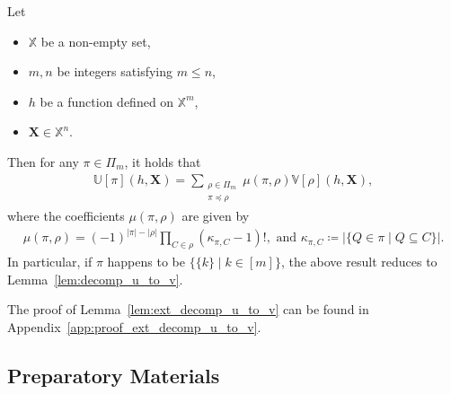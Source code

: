 \documentclass[twoside,11pt]{article}
\newcommand{\sPi}{\pi}
\newcommand{\ustat}{\mathbb{U}}
\newcommand{\vstat}{\mathbb{V}}
\newcommand{\samplespace}{\bbX}
\newcommand{\partition}{\Pi}
\newcommand{\partitionp}[1]{\partition_{#1}}
\newcommand{\pleq}{\preceq}
\def\bbX{\mathbb{X}}
\begin{document}
\begin{lemma}
\label{lem:ext_decomp_u_to_v}
    Let
    \begin{itemize}
        \item $\samplespace$ be a non-empty set,
        \item $m,n$ be integers satisfying $m \leq n$,
        \item $h$ be a function defined on $\samplespace^m$,
        \item $\bm{X} \in \samplespace^n$. 
    \end{itemize}
    Then for any $\sPi \in \partitionp{m}$, it holds that
    \begin{align*}
        \ustat[\sPi](h,\bm{X}) 
        = \sum_{\substack{ \rho \in \partitionp{m} \\ \sPi \pleq \rho }}  
        \mu(\sPi, \rho)  \vstat[\rho](h, \bm{X}),
    \end{align*}
    where the coefficients $\mu(\sPi, \rho)$ are given by
    \begin{align*}
        \mu(\sPi, \rho) 
        = (-1)^{|\sPi|-|\rho|} 
        \prod_{C \in \rho} (\kappa_{\sPi, C} - 1)!, \text{ and } \kappa_{\sPi, C} \coloneqq |\{ Q \in \sPi \mid Q \subseteq C \}|.
    \end{align*}
    In particular, if $\sPi$ happens to be $\{\{k\} \mid k \in [m]\}$, the above result reduces to Lemma~\ref{lem:decomp_u_to_v}. 
\end{lemma}

The proof of Lemma~\ref{lem:ext_decomp_u_to_v} can be found in Appendix~\ref{app:proof_ext_decomp_u_to_v}.

\subsection{Preparatory Materials}\label{app:preparatory_materials}
\end{document}
